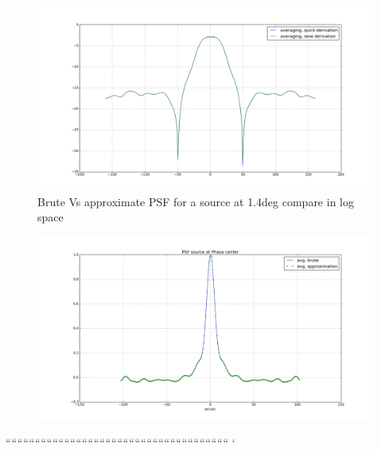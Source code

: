  \begin{figure}
\includegraphics[width=1\textwidth]{./Figures/averaging_brute_quick_logscale.png}\caption{Brute Vs approximate PSF for a source at 1.4deg compare in log space}\label{fig:corrSigVLAMxBl_overlapGdelta}
\end{figure}
 \begin{figure}
\includegraphics[width=1\textwidth]{./Figures/phasecentre.png}
\end{figure}	````````````````````````````````````````````````````````````````````````````	`
% 
